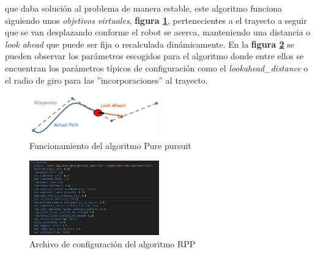 que daba solución al problema de manera estable, este algoritmo funciona siguiendo unos \textit{objetivos virtuales}, 
\textbf{figura \ref{fig:pure_pursui_teoria}}, pertenecientes a el trayecto a seguir que se van desplazando conforme el robot se acerca, 
manteniendo una distancia o \textit{look ahead} que puede ser fija o recalculada dinámicamente. En la 
\textbf{figura \ref{fig:rpp_configuracion}} se pueden observar los parámetros escogidos para el algoritmo donde entre ellos se encuentran 
los parámetros típicos de configuración como el \textit{lookahead\_distance} o el radio de giro para las ''incorporaciones'' al trayecto.
\begin{figure}[h]
    \centering
    \includegraphics[width=0.5\textwidth]{images/pure_pursuit_teoria.png}
    \caption{Funcionamiento del algoritmo Pure pursuit}
    \label{fig:pure_pursui_teoria}
\end{figure}

\begin{figure}[H]
    \centering
    \includegraphics[width=0.5\textwidth]{images/rpp_configuration.png}
    \caption{Archivo de configuración del algoritmo RPP}
    \label{fig:rpp_configuracion}
\end{figure}

